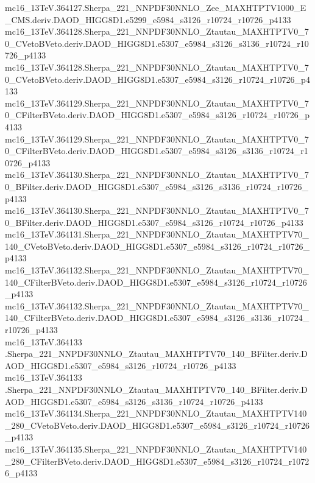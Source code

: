 \begin{footnotesize}
mc16\_13TeV.364127.Sherpa\_221\_NNPDF30NNLO\_Zee\_MAXHTPTV1000\_E\_CMS.deriv.DAOD\_HIGG8D1.e5299\_e5984\_s3126\_r10724\_r10726\_p4133 \\
mc16\_13TeV.364128.Sherpa\_221\_NNPDF30NNLO\_Ztautau\_MAXHTPTV0\_70\_CVetoBVeto.deriv.DAOD\_HIGG8D1.e5307\_e5984\_s3126\_s3136\_r10724\_r10726\_p4133 \\
mc16\_13TeV.364128.Sherpa\_221\_NNPDF30NNLO\_Ztautau\_MAXHTPTV0\_70\_CVetoBVeto.deriv.DAOD\_HIGG8D1.e5307\_e5984\_s3126\_r10724\_r10726\_p4133 \\
mc16\_13TeV.364129.Sherpa\_221\_NNPDF30NNLO\_Ztautau\_MAXHTPTV0\_70\_CFilterBVeto.deriv.DAOD\_HIGG8D1.e5307\_e5984\_s3126\_r10724\_r10726\_p4133 \\
mc16\_13TeV.364129.Sherpa\_221\_NNPDF30NNLO\_Ztautau\_MAXHTPTV0\_70\_CFilterBVeto.deriv.DAOD\_HIGG8D1.e5307\_e5984\_s3126\_s3136\_r10724\_r10726\_p4133 \\
mc16\_13TeV.364130.Sherpa\_221\_NNPDF30NNLO\_Ztautau\_MAXHTPTV0\_70\_BFilter.deriv.DAOD\_HIGG8D1.e5307\_e5984\_s3126\_s3136\_r10724\_r10726\_p4133 \\
mc16\_13TeV.364130.Sherpa\_221\_NNPDF30NNLO\_Ztautau\_MAXHTPTV0\_70\_BFilter.deriv.DAOD\_HIGG8D1.e5307\_e5984\_s3126\_r10724\_r10726\_p4133 \\
mc16\_13TeV.364131.Sherpa\_221\_NNPDF30NNLO\_Ztautau\_MAXHTPTV70\_140\_CVetoBVeto.deriv.DAOD\_HIGG8D1.e5307\_e5984\_s3126\_r10724\_r10726\_p4133 \\
mc16\_13TeV.364132.Sherpa\_221\_NNPDF30NNLO\_Ztautau\_MAXHTPTV70\_140\_CFilterBVeto.deriv.DAOD\_HIGG8D1.e5307\_e5984\_s3126\_r10724\_r10726\_p4133 \\
mc16\_13TeV.364132.Sherpa\_221\_NNPDF30NNLO\_Ztautau\_MAXHTPTV70\_140\_CFilterBVeto.deriv.DAOD\_HIGG8D1.e5307\_e5984\_s3126\_s3136\_r10724\_r10726\_p4133 \\
mc16\_13TeV.364133 \\.Sherpa\_221\_NNPDF30NNLO\_Ztautau\_MAXHTPTV70\_140\_BFilter.deriv.DAOD\_HIGG8D1.e5307\_e5984\_s3126\_r10724\_r10726\_p4133 \\
mc16\_13TeV.364133 \\.Sherpa\_221\_NNPDF30NNLO\_Ztautau\_MAXHTPTV70\_140\_BFilter.deriv.DAOD\_HIGG8D1.e5307\_e5984\_s3126\_s3136\_r10724\_r10726\_p4133 \\
mc16\_13TeV.364134.Sherpa\_221\_NNPDF30NNLO\_Ztautau\_MAXHTPTV140\_280\_CVetoBVeto.deriv.DAOD\_HIGG8D1.e5307\_e5984\_s3126\_r10724\_r10726\_p4133 \\
mc16\_13TeV.364135.Sherpa\_221\_NNPDF30NNLO\_Ztautau\_MAXHTPTV140\_280\_CFilterBVeto.deriv.DAOD\_HIGG8D1.e5307\_e5984\_s3126\_r10724\_r10726\_p4133 \\

\end{footnotesize}
